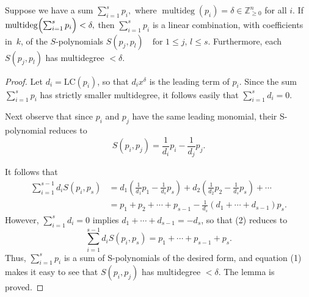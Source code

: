 \begin{lemma}\label{lem:Spolynomial_syzygy_of_degree_cancellation} %
    \leanok 
    Suppose we have a sum $\sum_{i=1}^s p_i,$ where $\operatorname{multideg}(p_i)=\delta\in\mathbb Z_{\ge0}^n$ for all $i$.
    If $\operatorname{multideg}\Bigl(\sum_{i=1}^s p_i\Bigr)<\delta,$ then $\sum_{i=1}^s p_i$ is a linear combination, with coefficients in~$k$, of the $S$-polynomials $S(p_j,p_l)\quad\text{for }1\le j,\,l\le s$.
    Furthermore, each $S(p_j,p_l)$ has multidegree $<\delta$.
\end{lemma}
\begin{proof}
  \leanok
  Let $d_i = \text{LC}(p_i)$, so that $d_i x^\delta$ is the leading term of $p_i$. Since the sum $\sum_{i=1}^s p_i$ has strictly smaller multidegree, it follows easily that $\sum_{i=1}^s d_i = 0$.

  Next observe that since $p_i$ and $p_j$ have the same leading monomial, their S-polynomial reduces to
  \begin{equation} \tag{1}
  S(p_i, p_j) = \frac{1}{d_i}p_i - \frac{1}{d_j}p_j.
  \end{equation}

  It follows that
  \begin{equation} \tag{2}
  \begin{aligned}
  \sum_{i=1}^{s-1} d_i S(p_i, p_s) &= d_1\left(\frac{1}{d_1}p_1 - \frac{1}{d_s}p_s\right) + d_2\left(\frac{1}{d_2}p_2 - \frac{1}{d_s}p_s\right) + \cdots \\
  &= p_1 + p_2 + \cdots + p_{s-1} - \frac{1}{d_s}(d_1 + \cdots + d_{s-1})p_s.
  \end{aligned}
  \end{equation}
  However, $\sum_{i=1}^s d_i = 0$ implies $d_1 + \cdots + d_{s-1} = -d_s$, so that (2) reduces to
  \[
  \sum_{i=1}^{s-1} d_i S(p_i, p_s) = p_1 + \cdots + p_{s-1} + p_s.
  \]
  Thus, $\sum_{i=1}^s p_i$ is a sum of S-polynomials of the desired form, and equation (1) makes it easy to see that $S(p_i, p_j)$ has multidegree $<\delta$. The lemma is proved.
\end{proof}

